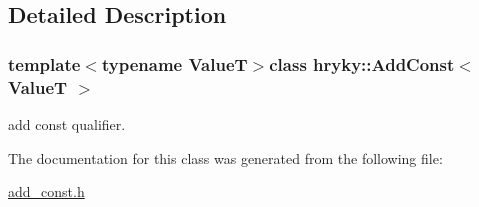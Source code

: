 \subsection{Detailed Description}
\subsubsection*{template$<$typename Value\-T$>$class hryky\-::\-Add\-Const$<$ Value\-T $>$}

add const qualifier. 

The documentation for this class was generated from the following file\-:\begin{DoxyCompactItemize}
\item 
\hyperlink{add__const_8h}{add\-\_\-const.\-h}\end{DoxyCompactItemize}
